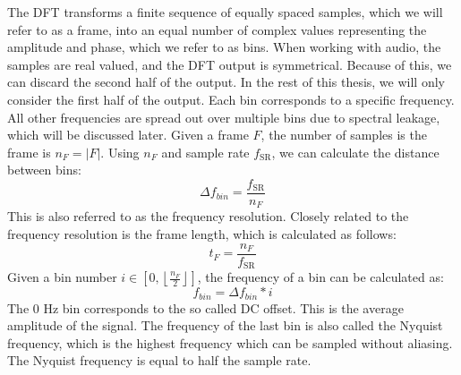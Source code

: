 \documentclass[10pt,twocolumn]{article}
\newcommand{\floor}[1]{\left \lfloor #1 \right \rfloor}
\begin{document}
The DFT transforms a finite sequence of equally spaced samples, which we will refer to as a frame, into an equal number of complex values representing the amplitude and phase, which we refer to as bins. When working with audio, the samples are real valued, and the DFT output is symmetrical. Because of this, we can discard the second half of the output. In the rest of this thesis, we will only consider the first half of the output. Each bin corresponds to a specific frequency. All other frequencies are spread out over multiple bins due to spectral leakage, which will be discussed later. Given a frame $F$, the number of samples is the frame is $n_F = |F|$. Using $n_F$ and sample rate $f_{\text{SR}}$, we can calculate the distance between bins:
\[ \Delta f_{bin} = \frac{f_{\text{SR}}}{n_F} \]
This is also referred to as the frequency resolution. Closely related to the frequency resolution is the frame length, which is calculated as follows:
\[ t_F = \frac{n_F}{f_{\text{SR}}} \]
Given a bin number $i \in [0, \floor{\frac{n_F}{2}}]$, the frequency of a bin can be calculated as:
\[ f_{bin} = \Delta f_{bin} * i \]
The 0 Hz bin corresponds to the so called DC offset. This is the average amplitude of the signal. The frequency of the last bin is also called the Nyquist frequency, which is the highest frequency which can be sampled without aliasing. The Nyquist frequency is equal to half the sample rate.
\end{document}
